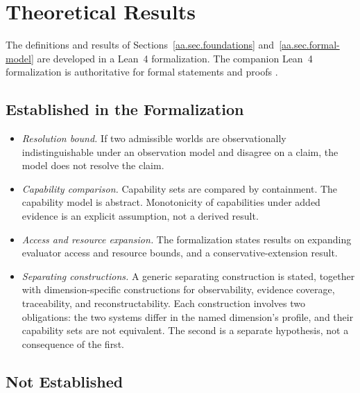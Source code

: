 \section{Theoretical Results}
\label{aa.sec.theoretical-results}

The definitions and results of Sections~\ref{aa.sec.foundations} and~\ref{aa.sec.formal-model}
are developed in a Lean~4 formalization.
The companion Lean~4 formalization
is authoritative for formal statements and proofs
\citep{case2026sestructuralassurability}.

\subsection{Established in the Formalization}

\begin{itemize}
  \item \emph{Resolution bound.}
        If two admissible worlds are observationally indistinguishable under an observation model
        and disagree on a claim, the model does not resolve the claim.

  \item \emph{Capability comparison.}
        Capability sets are compared by containment.
        The capability model is abstract.
        Monotonicity of capabilities under added evidence is an explicit assumption, not a derived result.

  \item \emph{Access and resource expansion.}
        The formalization states results on expanding evaluator access and resource bounds,
        and a conservative-extension result.

  \item \emph{Separating constructions.}
        A generic separating construction is stated,
        together with dimension-specific constructions for
        observability, evidence coverage, traceability, and reconstructability.
        Each construction involves two obligations:
        the two systems differ in the named dimension's profile,
        and their capability sets are not equivalent.
        The second is a separate hypothesis, not a consequence of the first.
\end{itemize}

\subsection{Not Established}

